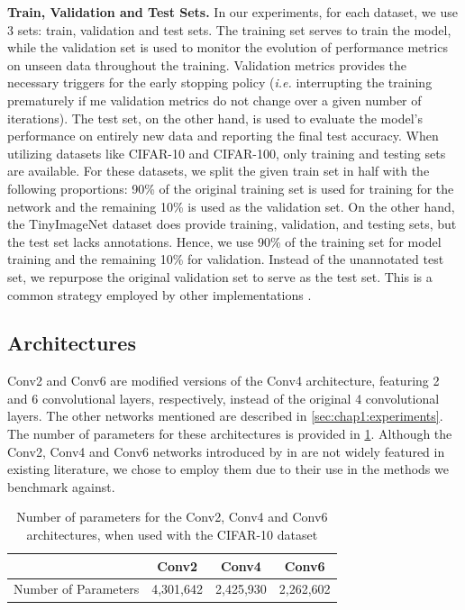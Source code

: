 \textbf{Train, Validation and Test Sets.} 
In our experiments, for each dataset, we use 3 sets: train, validation and test
sets. The training set serves to train the model, while the validation set is
used to monitor the evolution of performance metrics on unseen data throughout
the training. Validation metrics provides the necessary triggers for the early
stopping policy (\emph{i.e.} interrupting the training prematurely if me
validation metrics do not change over a given number of iterations). The test
set, on the other hand, is used to evaluate the model's performance on entirely
new data and reporting the final test accuracy. When utilizing datasets like
CIFAR-10 and CIFAR-100, only training and testing sets are available. For these
datasets, we split the given train set in half with the following proportions:
90\% of the original training set is used for training for the network and the
remaining 10\% is used as the validation set. On the other hand, the
TinyImageNet dataset does provide training, validation, and testing sets, but
the test set lacks annotations. Hence, we use 90\% of the training set for model
training and the remaining 10\% for validation. Instead of the unannotated test
set, we repurpose the original validation set to serve as the test set. This is
a common strategy employed by other implementations
\cite{hanyuanxu2018tinyimagenet,nbdt,alvinwan2020nbdt}.\\

\subsection{Architectures}\label{sec:intro:architectures}

Conv2 and Conv6 are modified versions of the Conv4 architecture, featuring 2 and
6 convolutional layers, respectively, instead of the original 4 convolutional
layers. The other networks mentioned are described in
\cref{sec:chap1:experiments}. The number of parameters for these architectures
is provided in \cref{tab:chap2:conv_num_params}. Although the Conv2, Conv4 and
Conv6 networks introduced by \citeauthor{DBLP:conf/iclr/FrankleC19} in
\cite{DBLP:conf/iclr/FrankleC19} are not widely featured in existing literature,
we chose to employ them due to their use in the methods we benchmark against.

\begin{table}[ht!]
    \centering\begin{tabular}{lccc}
      \cmidrule[\heavyrulewidth]{2-4}
                           & \textbf{Conv2} & \textbf{Conv4} & \textbf{Conv6} \\ \toprule
      Number of Parameters & 4,301,642      & 2,425,930      & 2,262,602      \\ \bottomrule
    \end{tabular}
    \caption{Number of parameters for the Conv2, Conv4 and Conv6 architectures, when used with the CIFAR-10 dataset}
    \label{tab:chap2:conv_num_params}
\end{table}

